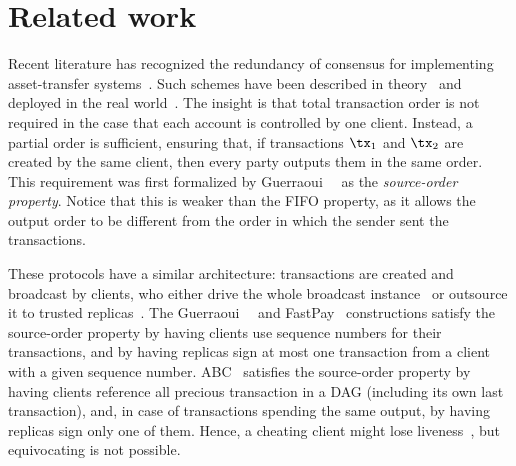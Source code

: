 \section{Related work}\label{app:related}

Recent literature has recognized the redundancy of consensus for implementing asset-transfer systems~\cite{DBLP:journals/dc/GuerraouiKMPS22}.
Such schemes have been described in theory~\cite{DBLP:journals/corr/abs-1909-10926, DBLP:conf/dsn/CollinsGKKMPPST20} and deployed in the real world~\cite{DBLP:conf/aft/BaudetDS20}.
The insight is that total transaction order is not required in the case that each account is controlled by one client.
Instead, a partial order is sufficient, ensuring that, if transactions $\tx_1$ and $\tx_2$ are created by the same client, then every party outputs them in the same order.
This requirement was first formalized by Guerraoui~\etal~\cite{DBLP:journals/dc/GuerraouiKMPS22} as the \emph{source-order property}. Notice that this is weaker than the FIFO property, as it allows the output order to be different from the order in which the sender sent the transactions.

These protocols have a similar architecture: transactions are created and broadcast by clients, who either drive the whole broadcast instance~\cite{DBLP:conf/aft/BaudetDS20} or outsource it to trusted replicas~\cite{DBLP:conf/dsn/CollinsGKKMPPST20}.
The Guerraoui~\etal~\cite{DBLP:journals/dc/GuerraouiKMPS22} and FastPay~\cite{DBLP:conf/aft/BaudetDS20} constructions satisfy the source-order property by having clients use sequence numbers for their transactions, and by having replicas sign at most one transaction from a client with a given sequence number.
ABC~\cite{DBLP:journals/corr/abs-1909-10926} satisfies the source-order property by having clients reference all precious transaction in a DAG (including its own last transaction), and, in case of transactions spending the same output, by having replicas sign only one of them.
Hence, a cheating client might lose liveness~\cite{DBLP:conf/aft/BaudetDS20,DBLP:journals/dc/GuerraouiKMPS22,DBLP:journals/corr/abs-1909-10926}, but equivocating is not possible.


